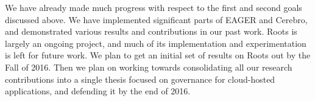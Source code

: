 We have already made much progress with respect to the first and second goals discussed above.
We have implemented significant parts of EAGER and Cerebro, and demonstrated various results
and contributions in our past work. Roots is largely an ongoing project, and much of its implementation
and experimentation is left for future work. We plan to get an initial set of results on Roots out
by the Fall of 2016. Then we plan on working towards consolidating all our research contributions
into a single thesis focused on governance for cloud-hosted applications, and defending it
by the end of 2016. 